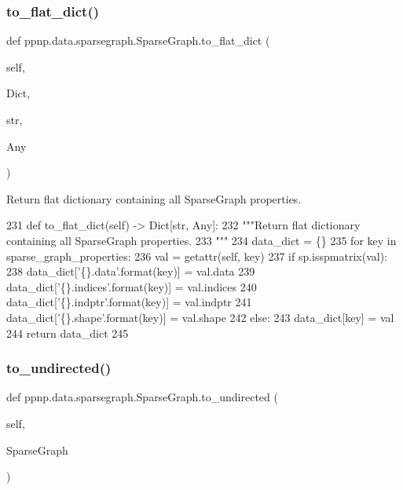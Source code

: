 \subsubsection{\texorpdfstring{to\+\_\+flat\+\_\+dict()}{to\_flat\_dict()}}
{\footnotesize\ttfamily def ppnp.\+data.\+sparsegraph.\+Sparse\+Graph.\+to\+\_\+flat\+\_\+dict (\begin{DoxyParamCaption}\item[{}]{self,  }\item[{}]{Dict,  }\item[{}]{str,  }\item[{}]{Any }\end{DoxyParamCaption})}

\begin{DoxyVerb}Return flat dictionary containing all SparseGraph properties.
\end{DoxyVerb}
 
\begin{DoxyCode}
231     \textcolor{keyword}{def }to\_flat\_dict(self) -> Dict[str, Any]:
232         \textcolor{stringliteral}{"""Return flat dictionary containing all SparseGraph properties.}
233 \textcolor{stringliteral}{        """}
234         data\_dict = \{\}
235         \textcolor{keywordflow}{for} key \textcolor{keywordflow}{in} sparse\_graph\_properties:
236             val = getattr(self, key)
237             \textcolor{keywordflow}{if} sp.isspmatrix(val):
238                 data\_dict[\textcolor{stringliteral}{'\{\}.data'}.format(key)] = val.data
239                 data\_dict[\textcolor{stringliteral}{'\{\}.indices'}.format(key)] = val.indices
240                 data\_dict[\textcolor{stringliteral}{'\{\}.indptr'}.format(key)] = val.indptr
241                 data\_dict[\textcolor{stringliteral}{'\{\}.shape'}.format(key)] = val.shape
242             \textcolor{keywordflow}{else}:
243                 data\_dict[key] = val
244         \textcolor{keywordflow}{return} data\_dict
245 
\end{DoxyCode}
\mbox{\label{classppnp_1_1data_1_1sparsegraph_1_1SparseGraph_a5abd99db4591e9a156f59621802957ec}} 
\subsubsection{\texorpdfstring{to\+\_\+undirected()}{to\_undirected()}}
{\footnotesize\ttfamily def ppnp.\+data.\+sparsegraph.\+Sparse\+Graph.\+to\+\_\+undirected (\begin{DoxyParamCaption}\item[{}]{self,  }\item[{}]{Sparse\+Graph }\end{DoxyParamCaption})}

